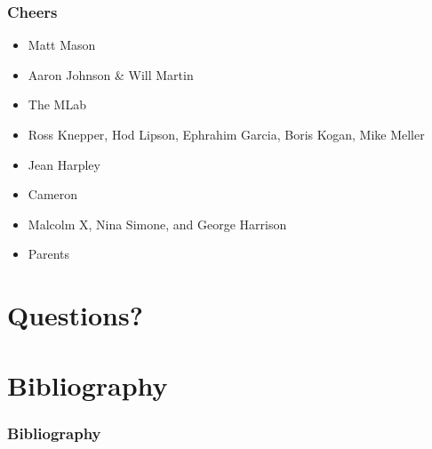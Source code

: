 \documentclass[aspectratio=169,handout]{beamer}
\begin{document}
%
	
	\begin{frame}
	\frametitle{Cheers}
		\begin{itemize}
			\item Matt Mason
			\item Aaron Johnson \& Will Martin
			\item The MLab
			\item Ross Knepper, Hod Lipson, Ephrahim Garcia, Boris Kogan, Mike Meller
			\item Jean Harpley
			\item Cameron
			\item Malcolm X, Nina Simone, and George Harrison
			\item Parents
		\end{itemize}
	\end{frame}

	\section{Questions?}
	
	\section{Bibliography}
	\nocite{*}
	\begin{frame}[allowframebreaks]
		\frametitle{Bibliography}
		\printbibliography[heading=none]
	\end{frame}

	\backupend
\end{document}
